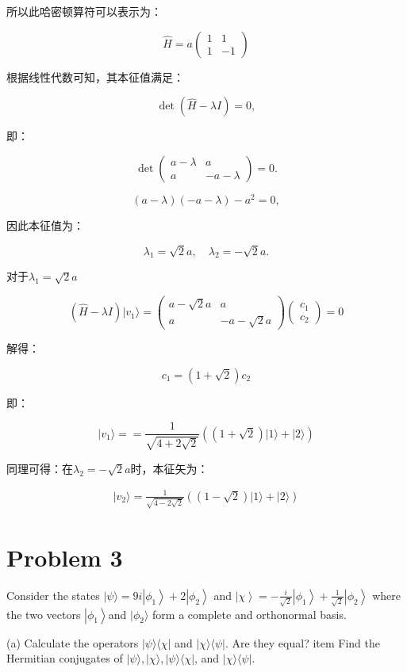 \documentclass[dvipsnames, svgnames,a4paper,11pt]{article}
\begin{document}
所以此哈密顿算符可以表示为：

$$\hat{H}=a\begin{pmatrix}1&1\\1&-1\end{pmatrix}$$

根据线性代数可知，其本征值满足：

$$\det(\hat{H}-\lambda I)=0,$$

即：

$$\det\begin{pmatrix}a-\lambda&a\\a&-a-\lambda\end{pmatrix}=0.$$

$$(a-\lambda)(-a-\lambda)-a^2=0,$$

因此本征值为：

$$\lambda_1=\sqrt{2}a,\quad\lambda_2=-\sqrt{2}a.$$

对于$\lambda_1=\sqrt{2}a$

$$(\hat{H}-\lambda I) |v_1\rangle=\begin{pmatrix}a-\sqrt{2}a&a\\a&-a-\sqrt{2}a\end{pmatrix}\begin{pmatrix}c_1\\c_2\end{pmatrix}=0$$

解得：

$$c_1=(1+\sqrt{2})c_2$$

即：

$$|v_{1}\rangle==\frac{1}{\sqrt{4+2\sqrt{2}}}((1+\sqrt{2}) |1\rangle+|2\rangle)$$

同理可得：在$\lambda_2=-\sqrt{2}a$时，本征矢为：

$$\begin{aligned}|v_{2}\rangle=\frac{1}{\sqrt{4-2\sqrt{2}}}((1-\sqrt{2}) |1\rangle+|2\rangle)\end{aligned}$$

\section{Problem 3}

Consider the states $|\psi\rangle=9i\left|\phi_1\right\rangle+2\left|\phi_2\right\rangle$ and $\left|\chi\right\rangle=-\frac i{\sqrt{2}}\left|\phi_1\right\rangle+\frac1{\sqrt{2}}\left|\phi_2\right\rangle$ where the two vectors $\left|\phi_1\right\rangle$and $|\phi_{2}\rangle$ form a complete and orthonormal basis.

(a) Calculate the operators $|\psi\rangle\langle\chi|$ and $|\chi\rangle\langle\psi|.$ Are they equal?
item Find the Hermitian conjugates of $|\psi\rangle,|\chi\rangle,|\psi\rangle\langle\chi|$, and $|\chi\rangle\langle\psi|$.
\end{document}
